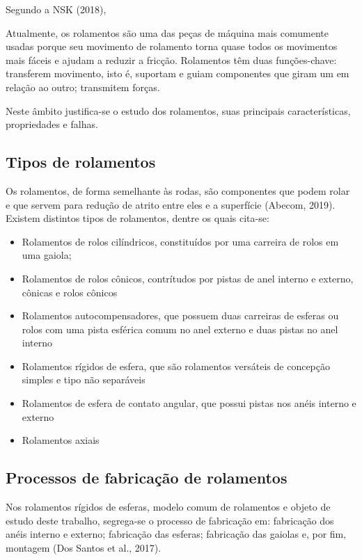 \documentclass[
	12pt,				
	oneside,			
	a4paper,			
	english,			
	brazil				
	]{abntex2ppgsi}
\begin{document}
Segundo a NSK (2018), 

\begin{citacao}
Atualmente, os rolamentos são uma das peças de máquina mais comumente usadas porque seu movimento de rolamento torna quase todos os movimentos mais fáceis e ajudam a reduzir a fricção. Rolamentos têm duas funções-chave: transferem movimento, isto é, suportam e guiam componentes que giram um em relação ao outro; transmitem forças.
\end{citacao}

Neste âmbito justifica-se o estudo dos rolamentos, suas principais características, propriedades e falhas.

\subsection{\textbf{Tipos de rolamentos}}

Os rolamentos, de forma semelhante às rodas, são componentes que podem rolar  e que servem para redução de atrito entre eles e a superfície (Abecom, 2019). Existem distintos tipos de rolamentos, dentre os quais cita-se:

\begin{itemize}
	\item Rolamentos de rolos cilíndricos, constituídos por uma carreira de rolos em uma gaiola; 
	\item Rolamentos de rolos cônicos, contrítudos por pistas de anel interno e externo, cônicas e rolos cônicos
	\item Rolamentos autocompensadores, que possuem duas carreiras de esferas ou rolos com uma pista esférica comum no anel externo e duas pistas no anel interno 
	\item Rolamentos rígidos de esfera, que são rolamentos versáteis de concepção simples e tipo não separáveis
	\item Rolamentos de esfera de contato angular, que possui pistas nos anéis interno e externo
	\item Rolamentos axiais
\end{itemize}

\subsection{\textbf{Processos de fabricação de rolamentos}}

Nos rolamentos rígidos de esferas, modelo comum de rolamentos e objeto de estudo deste trabalho, segrega-se o processo de fabricação em: fabricação dos anéis interno e externo; fabricação das esferas; fabricação das gaiolas e, por fim, montagem (Dos Santos et al., 2017).   
\end{document}
